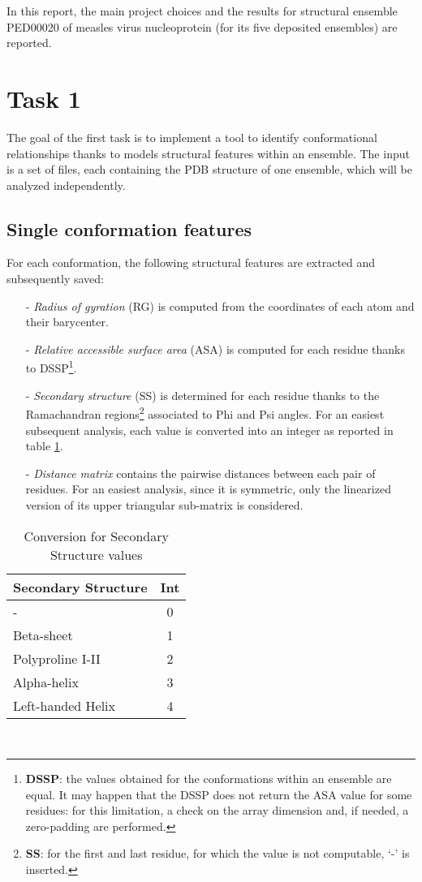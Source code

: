 In this report, the main project choices and the results for structural ensemble PED00020 of measles virus nucleoprotein (for its five deposited ensembles) are reported.

\section{Task 1}\label{sec:task1}
\graphicspath{ {./figures/} }

The goal of the first task is to implement a tool to identify conformational relationships thanks to models structural features within an ensemble. The input is a set of files, each containing the PDB structure of one ensemble, which will be analyzed independently.

\subsection{Single conformation features}

For each conformation, the following structural features are extracted and subsequently saved:
\begin{itemize}
\item[-] \emph{Radius of gyration} (RG) is computed from the coordinates of each atom and their barycenter.
\item[-] \emph{Relative accessible surface area} (ASA) is computed for each residue thanks to DSSP\footnote{\textbf{DSSP}: the values obtained for the conformations within an ensemble are equal. It may happen that the DSSP does not return the ASA value for some residues: for this limitation, a check on the array dimension and, if needed, a zero-padding are performed. }.
\item[-] \emph{Secondary structure} (SS) is determined for each residue thanks to the Ramachandran regions\footnote{\textbf{SS}: for the first and last residue, for which the value is not computable, `-' is inserted.} associated to Phi and Psi angles. For an easiest subsequent analysis, each value is converted into an integer as reported in table \ref{tab:ss}.
\item[-] \emph{Distance matrix} contains the pairwise distances between each pair of residues. For an easiest analysis, since it is symmetric, only the linearized version of its upper triangular sub-matrix is considered.
\end{itemize}

\begin{table}[H]
\begin{center}
\begin{tabular}{lc}
\textbf{Secondary Structure} & \textbf{Int}\\
\hline
- & 0\\
\hline
Beta-sheet & 1\\
\hline
Polyproline I-II & 2\\
\hline
Alpha-helix & 3\\
\hline
Left-handed Helix & 4\\
\end{tabular}
\end{center}
\caption{Conversion for Secondary Structure values}~\label{tab:ss}
\end{table}


